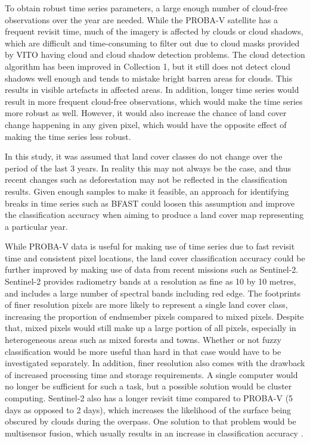 \documentclass[a4paper,12pt]{scrbook}
\begin{document}
To obtain robust time series parameters, a large enough number of cloud-free observations over the year are needed. While the PROBA-V satellite has a frequent revisit time, much of the imagery is affected by clouds or cloud shadows, which are difficult and time-consuming to filter out due to cloud masks provided by VITO having cloud and cloud shadow detection problems. The cloud detection algorithm has been improved in Collection 1, but it still does not detect cloud shadows well enough and tends to mistake bright barren areas for clouds. This results in visible artefacts in affected areas. In addition, longer time series would result in more frequent cloud-free observations, which would make the time series more robust as well. However, it would also increase the chance of land cover change happening in any given pixel, which would have the opposite effect of making the time series less robust.

In this study, it was assumed that land cover classes do not change over the period of the last 3 years. In reality this may not always be the case, and thus recent changes such as deforestation may not be reflected in the classification results. Given enough samples to make it feasible, an approach for identifying breaks in time series such as BFAST \citep{Verbesselt2010bfast} could loosen this assumption and improve the classification accuracy when aiming to produce a land cover map representing a particular year.

While PROBA-V data is useful for making use of time series due to fast revisit time and consistent pixel locations, the land cover classification accuracy could be further improved by making use of data from recent missions such as Sentinel-2. Sentinel-2 provides radiometry bands at a resolution as fine as 10 by 10 metres, and includes a large number of spectral bands including red edge. The footprints of finer resolution pixels are more likely to represent a single land cover class, increasing the proportion of endmember pixels compared to mixed pixels. Despite that, mixed pixels would still make up a large portion of all pixels, especially in heterogeneous areas such as mixed forests and towns. Whether or not fuzzy classification would be more useful than hard in that case would have to be investigated separately. In addition, finer resolution also comes with the drawback of increased processing time and storage requirements. A single computer would no longer be sufficient for such a task, but a possible solution would be cluster computing. Sentinel-2 also has a longer revisit time compared to PROBA-V (5 days as opposed to 2 days), which increases the likelihood of the surface being obscured by clouds during the overpass. One solution to that problem would be multisensor fusion, which usually results in an increase in classification accuracy \citep{yu2014metadiscoveries}.
\end{document}
